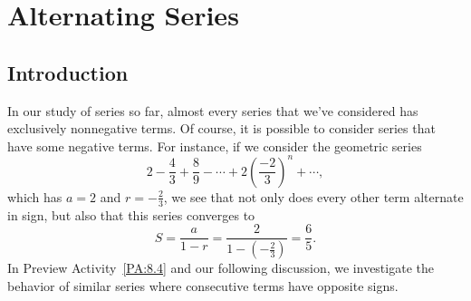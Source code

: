 \section{Alternating Series} \label{S:8.4.Alternating}

\vspace*{-14 pt}

\subsection*{Introduction}

In our study of series so far, almost every series that we've considered has exclusively nonnegative terms.  Of course, it is possible to consider series that have some negative terms.  For instance, if we consider the geometric series
$$2 - \frac{4}{3} + \frac{8}{9} - \cdots + 2 \left( \frac{-2}{3} \right)^n + \cdots,$$
which has $a = 2$ and $r = -\frac{2}{3}$, we see that not only does every other term alternate in sign, but also that this series converges to 
$$S = \frac{a}{1-r} = \frac{2}{1- \left(-\frac{2}{3}\right)} = \frac{6}{5}.$$
In Preview Activity~\ref{PA:8.4} and our following discussion, we investigate the behavior of similar series where consecutive terms have opposite signs.




